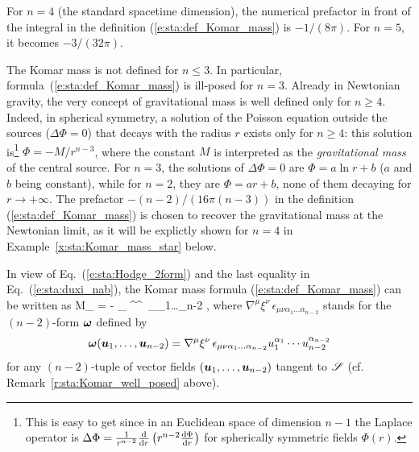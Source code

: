 \begin{remark}
For $n=4$ (the standard spacetime dimension), the numerical prefactor in front of
the integral in the definition (\ref{e:sta:def_Komar_mass}) is $-1/(8\pi)$.
For $n=5$, it becomes $-3/(32\pi)$.
\end{remark}

\begin{remark}
The Komar mass is not defined for $n \leq 3$. In particular,
formula~(\ref{e:sta:def_Komar_mass}) is ill-posed for $n=3$.
Already in Newtonian gravity, the very concept of gravitational mass is well defined only
for $n \geq 4$. Indeed, in spherical symmetry,
a solution of the Poisson equation outside the sources ($\Delta \Phi = 0$)
that decays with the radius $r$ exists only for $n \geq 4$: this solution is\footnote{This is easy
to get since in an Euclidean space of dimension $n-1$ the Laplace
operator is $\Delta\Phi = \frac{1}{r^{n-2}} \frac{\mathrm{d} }{\mathrm{d} r} \left( r^{n-2} \frac{\mathrm{d} \Phi}{\mathrm{d} r} \right)$
for spherically symmetric fields $\Phi(r)$.}
$\Phi = -M/r^{n-3}$,
where the constant $M$ is interpreted as the \emph{gravitational mass} of the central source.
For $n=3$, the solutions of $\Delta \Phi = 0$ are $\Phi = a \ln r + b$ ($a$ and $b$ being constant), while
for $n=2$, they are $\Phi = a r + b$, none of them decaying for $r\to +\infty$.
The prefactor $-(n-2)/(16\pi(n-3))$ in the definition (\ref{e:sta:def_Komar_mass})
is chosen to recover the gravitational mass at the Newtonian limit, as
it will be explictly shown for $n=4$ in Example~\ref{x:sta:Komar_mass_star} below.
\end{remark}

In view of Eq.~(\ref{e:sta:Hodge_2form}) and the last equality in Eq.~(\ref{e:sta:duxi_nab}),
the Komar mass formula (\ref{e:sta:def_Komar_mass}) can be written as
\be \label{e:sta:def_Komar_mass_alt}
    M_{\Sp} = -   \int_{\Sp}  \nabla^\mu \xi^\nu \,
    \epsilon_{\mu\nu\alpha_1\ldots\alpha_{n-2}} ,
\ee
where $\nabla^\mu \xi^\nu \, \epsilon_{\mu\nu\alpha_1\ldots\alpha_{n-2}}$
stands for the $(n-2)$-form $\bm{\omega}$ defined by
\[
  \bm{\omega}(\bm{u}_1,\ldots,\bm{u}_{n-2}) = \nabla^\mu \xi^\nu \,
\epsilon_{\mu\nu\alpha_1\ldots\alpha_{n-2}} u_1^{\alpha_1} \cdots  u_{n-2}^{\alpha_{n-2}}
\]
for any $(n-2)$-tuple of vector fields $(\bm{u}_1,\ldots,\bm{u}_{n-2})$ tangent to $\mathscr{S}$ (cf. Remark~\ref{r:sta:Komar_well_posed} above).

